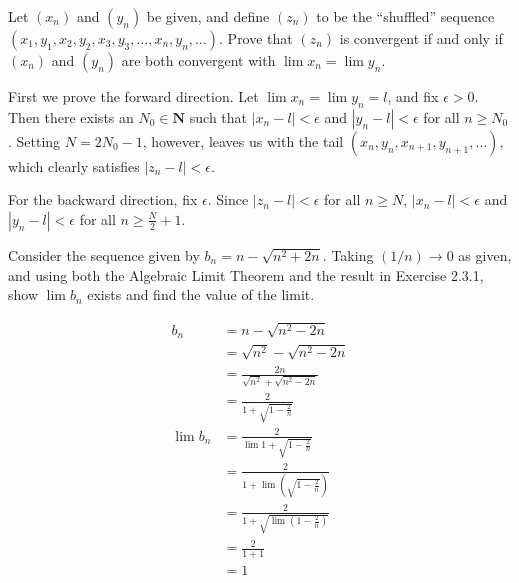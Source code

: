 \begin{exercise}
  Let $\left(x_{n}\right)$ and $\left(y_{n}\right)$ be given, and define $\left(z_{n}\right)$ to be the ``shuffled'' sequence $\left(x_{1}, y_{1}, x_{2}, y_{2}, x_{3}, y_{3}, \ldots, x_{n}, y_{n}, \ldots\right)$. Prove that $\left(z_{n}\right)$ is convergent if and only if $\left(x_{n}\right)$ and $\left(y_{n}\right)$ are both convergent with $\lim x_{n}=\lim y_{n}$.
\end{exercise}

\begin{solution}
  First we prove the forward direction. Let $\lim x_n = \lim y_n = l$, and fix $\epsilon>0$. Then there exists an $N_0\in\mathbf{N}$ such that $|x_n - l| <\epsilon$ and $|y_n-l|<\epsilon$ for all $n\geq N_0$. Setting $N=2N_0-1$, however, leaves us with the tail $(x_n, y_n, x_{n+1}, y_{n+1}, \ldots)$, which clearly satisfies $|z_n-l|<\epsilon$.
  \par
  For the backward direction, fix $\epsilon$. Since $|z_n - l| <\epsilon$ for all $n\geq N$, $|x_n - l| <\epsilon$ and $|y_n-l|<\epsilon$ for all $n \geq \frac{N}{2} + 1$.
\end{solution}

\begin{exercise}
  Consider the sequence given by $b_{n}=n-\sqrt{n^{2}+2 n}$. Taking $(1 / n) \rightarrow 0$ as given, and using both the Algebraic Limit Theorem and the result in Exercise 2.3.1, show $\lim b_{n}$ exists and find the value of the limit.
\end{exercise}

\begin{solution}
\BAD
$$
\begin{aligned}
b_n
&= n-\sqrt{n^2-2n} \\
&= \sqrt{n^2} - \sqrt{n^2-2n} \\
&= \frac{2n}{\sqrt{n^2}+\sqrt{n^2-2n}} \\
&= \frac{2}{1+\sqrt{1-\frac{2}{n}}}
\\
\lim b_n
&= \frac{2}{\lim{1+\sqrt{1-\frac{2}{n}}}} \\
&= \frac{2}{1+\lim\left(\sqrt{1-\frac{2}{n}}\right)} \\
&= \frac{2}{1+\sqrt{\lim \left( 1-\frac{2}{n} \right)}} \\
&= \frac{2}{1+1} \\
&= 1
\end{aligned}
$$
\end{solution}

